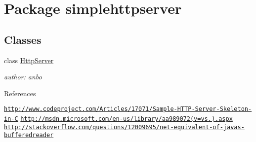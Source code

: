 \hypertarget{namespacesimplehttpserver}{\section{Package simplehttpserver}
\label{namespacesimplehttpserver}
}
\subsection*{Classes}
\begin{DoxyCompactItemize}
\item 
class \hyperlink{classsimplehttpserver_1_1_http_server}{Http\-Server}
\begin{DoxyCompactList}\small\item\em author\-: anbo\par
 References 
\begin{DoxyItemize}
\end{DoxyItemize}\href{http://www.codeproject.com/Articles/17071/Sample-HTTP-Server-Skeleton-in-C}{\tt http\-://www.\-codeproject.\-com/\-Articles/17071/\-Sample-\/\-H\-T\-T\-P-\/\-Server-\/\-Skeleton-\/in-\/\-C} \href{http://msdn.microsoft.com/en-us/library/aa989072(v=vs.80).aspx}{\tt http\-://msdn.\-microsoft.\-com/en-\/us/library/aa989072(v=vs.).\-aspx} \href{http://stackoverflow.com/questions/12009695/net-equivalent-of-javas-bufferedreader}{\tt http\-://stackoverflow.\-com/questions/12009695/net-\/equivalent-\/of-\/javas-\/bufferedreader} \end{DoxyCompactList}\end{DoxyCompactItemize}
